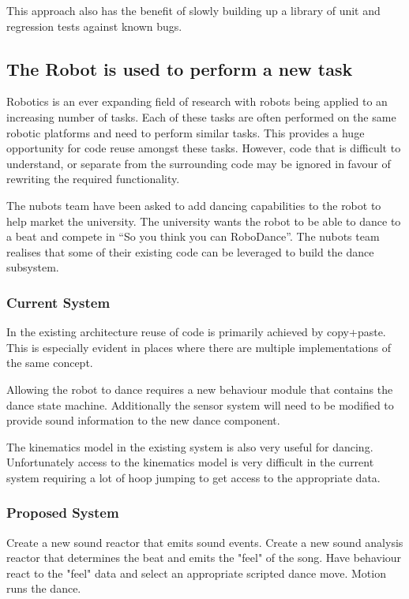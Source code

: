 \documentclass[english,12pt]{scrartcl}
\begin{document}
				This approach also has the benefit of slowly building up a library of unit and regression tests against known bugs.

		\subsection{The Robot is used to perform a new task}
			Robotics is an ever expanding field of research with robots being applied to an
			increasing number of tasks. Each of these tasks are often performed on the same robotic
			platforms and need to perform similar tasks. This provides a huge opportunity for code
			reuse amongst these tasks. However, code that is difficult to understand, or separate
			from the surrounding code may be ignored in favour of rewriting the required
			functionality.

			The \gls{nubots} team have been asked to add dancing capabilities to the robot to help market the 
			university. The university wants the robot to be able to dance to a beat and compete in 
			``So you think you can RoboDance''. The \gls{nubots} team realises that some of their existing
			code can be leveraged to build the dance subsystem.

			\subsubsection{Current System}
				In the existing architecture reuse of code is primarily achieved by copy+paste. This is 
				especially evident in places where there are multiple implementations of the same concept.
				
				Allowing the robot to dance requires a new behaviour module that contains the dance state
				machine. Additionally the sensor system will need to be modified to provide sound information
				to the new dance component. 
				
				The kinematics model in the existing system is also very useful for dancing. Unfortunately access
				to the kinematics model is very difficult in the current system requiring a lot of hoop jumping to
				get access to the appropriate data. 
			\subsubsection{Proposed System}
				Create a new sound \gls{reactor} that emits sound events. 
				Create a new sound analysis \gls{reactor} that determines the beat and emits
				the "feel" of the song.
				Have behaviour react to the "feel" data and select an appropriate scripted dance move.
				Motion runs the dance.
\end{document}
